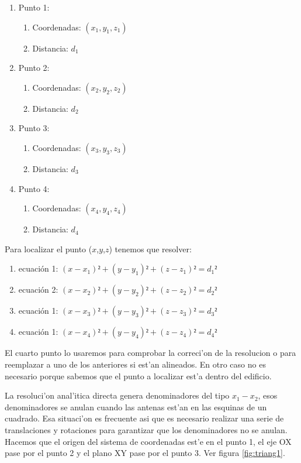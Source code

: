 \begin{enumerate}
\item Punto 1: 
	\begin{enumerate}
	\item Coordenadas: $(x_1,y_1,z_1)$
	\item Distancia: $d_1$
	\end{enumerate}

\item Punto 2: 
	\begin{enumerate}
	\item Coordenadas: $(x_2,y_2,z_2)$
	\item Distancia: $d_2$
	\end{enumerate}

\item Punto 3: 
	\begin{enumerate}
	\item Coordenadas: $(x_3,y_3,z_3)$
	\item Distancia: $d_3$
	\end{enumerate}

\item Punto 4: 
	\begin{enumerate}
	\item Coordenadas: $(x_4,y_4,z_4)$
	\item Distancia: $d_4$
	\end{enumerate}
\end{enumerate}

Para localizar el punto ($x$,$y$,$z$) tenemos que resolver:
\begin{enumerate}
	\item ecuación 1: $(x - x_1)² + (y - y_1)² +(z - z_1)² = d_1² $
	\item ecuación 2: $(x - x_2)² + (y - y_2)² +(z - z_2)² = d_2² $
	\item ecuación 1: $(x - x_3)² + (y - y_3)² +(z - z_3)² = d_3² $
	\item ecuación 1: $(x - x_4)² + (y - y_4)² +(z - z_4)² = d_4² $
\end{enumerate}

El cuarto punto lo usaremos para comprobar la correci'on de la resolucion o para reemplazar a uno de los anteriores si est'an alineados. En otro caso no es necesario porque sabemos que el punto a localizar est'a dentro del edificio.\bigskip\newline

La resoluci'on anal'itica directa genera denominadores del tipo $x_1 - x_2$, esos denominadores se anulan cuando las antenas est'an en las esquinas de un cuadrado. Esa situaci'on es frecuente asi que es necesario realizar una serie de translaciones y rotaciones para garantizar que los denominadores no se anulan. Hacemos que el origen del sistema de coordenadas est'e en el punto 1, el eje OX pase por el punto 2 y el plano XY pase por el punto 3.  Ver figura \ref{fig:triang1}. 

